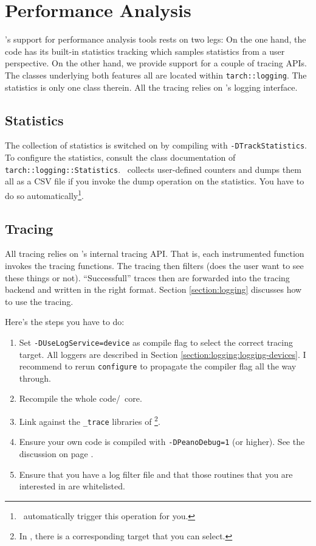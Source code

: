 \chapter{Performance Analysis}
\label{chapter:performance-analysis}


\Peano's support for performance analysis tools rests on two legs:
On the one hand, the code has its built-in statistics tracking which samples
statistics from a user perspective.
On the other hand, we provide support for a couple of tracing APIs.
The classes underlying both features all are located within
\texttt{tarch::logging}.
The statistics is only one class therein.
All the tracing relies on \Peano's logging interface.


\section{Statistics}

The collection of statistics is switched on by compiling with
\texttt{-DTrackStatistics}.
To configure the statistics, consult the class documentation of
\texttt{tarch::logging::Statistics}.
\Peano\ collects user-defined counters and dumps them all as a CSV file if you
invoke the dump operation on the statistics. 
You have to do so automatically\footnote{\ExaHyPE\ automatically trigger this
operation for you.}.



\section{Tracing}


All tracing relies on \Peano's internal tracing API.
That is, each instrumented function invokes the tracing functions.
The tracing then filters (does the user want to see these things or not).
``Successfull'' traces then are forwarded into the tracing backend and written
in the right format.
Section \ref{section:logging} discusses how to use the tracing.


Here's the steps you have to do:
\begin{enumerate}
  \item Set \texttt{-DUseLogService=device} as compile flag to select the
  correct tracing target. All loggers are described in Section
  \ref{section:logging:logging-devices}. I recommend to rerun \texttt{configure}
  to propagate the compiler flag all the way through.
  \item Recompile the whole code/\Peano\ core.
  \item Link against the \texttt{\_trace} libraries of \Peano\footnote{In
  \ExaHyPE, there is a corresponding target that you can select.}.
  \item Ensure your own code is compiled with \texttt{-DPeanoDebug=1} (or
  higher). See the discussion on page \pageref{section:logging}.
  \item Ensure that you have a log filter file and that those routines that you
  are interested in are whitelisted.
\end{enumerate}





